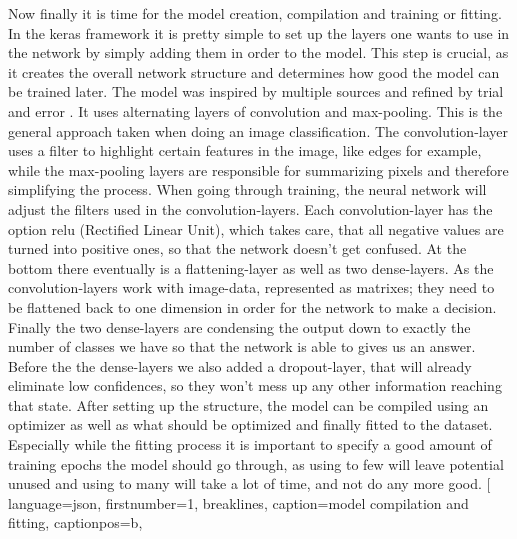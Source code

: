 

Now finally it is time for the model creation, compilation and training or
fitting. In the keras framework it is pretty simple to set up the layers one
wants to use in the network by simply adding them in order to the model. This
step is crucial, as it creates the overall network structure and determines how
good the model can be trained later. 
\newline
The model was inspired by multiple sources and refined by trial and error
\cite{Prakash2020}. 
It uses alternating layers of convolution and max-pooling. This is the general
approach taken when doing an image classification. The convolution-layer uses a
filter to highlight certain features in the image, like edges for example, while
the max-pooling layers are responsible for summarizing pixels and therefore
simplifying the process. When going through training, the neural network will
adjust the filters used in the convolution-layers. Each convolution-layer has
the option relu (Rectified Linear Unit), which takes care, that all negative
values are turned into positive ones, so that the network doesn't get confused.
At the bottom there eventually is a flattening-layer as well as two
dense-layers. As the convolution-layers work with image-data, represented as
matrixes; they need to be flattened back to one dimension in order for the
network to make a decision. Finally the two dense-layers are condensing the
output down to exactly the number of classes we have so that the network is able
to gives us an answer. Before the the dense-layers we also added a
dropout-layer, that will already eliminate low confidences, so they won't mess
up any other information reaching that state.
\newline
After setting up the structure, the model can be compiled using an optimizer as
well as what should be optimized and finally fitted to the dataset. Especially
while the fitting process it is important to specify a good amount of training
epochs the model should go through, as using to few will leave potential unused
and using to many will take a lot of time, and not do any more good.
[
    language=json,
    firstnumber=1,
    breaklines,
    caption={model compilation and fitting},
    captionpos=b, 

